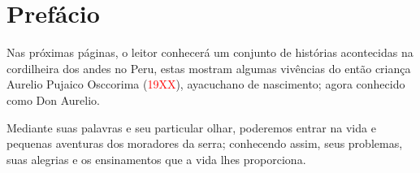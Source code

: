 \cleardoublepage
\newpage
\thispagestyle{empty}
\vfill


\chapter*{Prefácio} %

Nas próximas páginas, o leitor conhecerá um conjunto de histórias acontecidas na cordilheira dos andes no Peru, estas mostram algumas vivências do então criança Aurelio Pujaico Osccorima (\textcolor{red}{19XX}),
ayacuchano de nascimento;
agora conhecido como Don Aurelio.

Mediante suas palavras e seu particular olhar, poderemos entrar na vida e pequenas aventuras dos moradores da serra; conhecendo assim, seus problemas, suas alegrias e os ensinamentos que a vida lhes proporciona. 
\vfill

